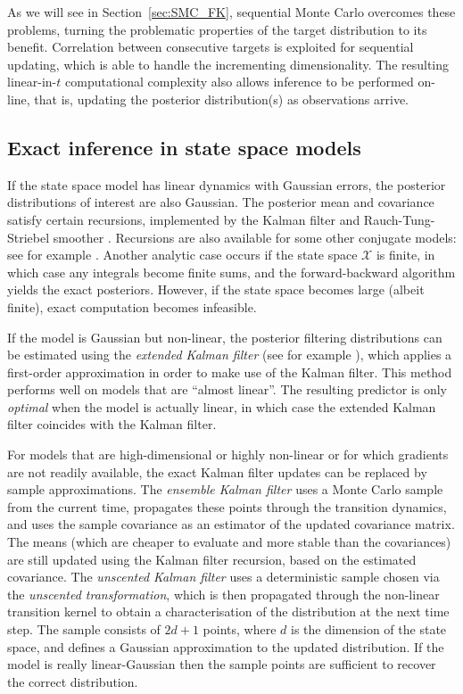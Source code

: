 As we will see in Section~\ref{sec:SMC_FK}, sequential Monte Carlo overcomes these problems, turning the problematic properties of the target distribution to its benefit. Correlation between consecutive targets is exploited for sequential updating, which is able to handle the incrementing dimensionality. The resulting linear-in-$t$ computational complexity also allows inference to be performed on-line, that is, updating the posterior distribution(s) as observations arrive.




\subsection{Exact inference in state space models}
\label{sec:SSM_exact_inference}
If the state space model has linear dynamics with Gaussian errors, the posterior distributions of interest are also Gaussian. The posterior mean and covariance satisfy certain recursions, implemented by the Kalman filter \parencite{kalman1960} and Rauch-Tung-Striebel smoother \parencite{rauch1965}. 
Recursions are also available for some other conjugate models: see for example \textcite{vidoni1999}.
Another analytic case occurs if the state space $\mathcal{X}$ is finite, in which case any integrals become finite sums, and the forward-backward algorithm \parencite{baum1970} yields the exact posteriors. However, if the state space becomes large (albeit finite), exact computation becomes infeasible.

If the model is Gaussian but non-linear, the posterior filtering distributions can be estimated using the \emph{extended Kalman filter} (see for example \textcite{jazwinski2007}), which applies a first-order approximation in order to make use of the Kalman filter. This method performs well on models that are ``almost linear''. The resulting predictor is only \emph{optimal} when the model is actually linear, in which case the extended Kalman filter coincides with the Kalman filter.

For models that are high-dimensional or highly non-linear or for which gradients are not readily available, the exact Kalman filter updates can be replaced by sample approximations.
The \emph{ensemble Kalman filter} \parencite{evensen1994} uses a Monte Carlo sample from the current time, propagates these points through the transition dynamics, and uses the sample covariance as an estimator of the updated covariance matrix. The means (which are cheaper to evaluate and more stable than the covariances) are still updated using the Kalman filter recursion, based on the estimated covariance.
The \emph{unscented Kalman filter} \parencite{wan2000} uses a deterministic sample chosen via the \emph{unscented transformation}, which is then propagated through the non-linear transition kernel to obtain a characterisation of the distribution at the next time step. The sample consists of $2d+1$ points, where $d$ is the dimension of the state space, and defines a Gaussian approximation to the updated distribution. If the model is really linear-Gaussian then the sample points are sufficient to recover the correct distribution.

